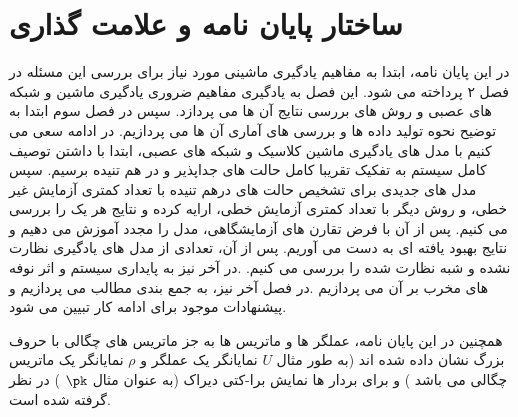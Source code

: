 \section{ساختار پایان نامه و علامت گذاری}





در این پایان نامه، ابتدا به مفاهیم یادگیری ماشینی مورد نیاز برای بررسی این مسئله در فصل ۲ پرداخته می شود. این فصل به یادگیری  مفاهیم ضروری یادگیری ماشین و شبکه های عصبی و روش های بررسی نتایج آن ها می پردازد.
سپس در فصل سوم ابتدا به توضیح نحوه تولید داده ها و بررسی های آماری آن ها می پردازیم. در ادامه سعی می کنیم با مدل های یادگیری ماشین کلاسیک و شبکه های عصبی، ابتدا با داشتن توصیف کامل سیستم به تفکیک تقریبا کامل حالت های جداپذیر و در هم تنیده برسیم. سپس مدل های جدیدی برای تشخیص حالت های درهم تنیده با تعداد کمتری آزمایش غیر خطی، و روش دیگر با تعداد کمتری آزمایش خطی، ارایه کرده و نتایج هر یک را بررسی می کنیم. پس از آن با فرض تقارن های آزمایشگاهی، مدل را مجدد آموزش می دهیم و نتایج بهبود یافته ای به دست می آوریم.
پس از آن، تعدادی از مدل های یادگیری نظارت نشده و شبه نظارت شده را بررسی می کنیم.
.در آخر نیز به پایداری سیستم و اثر نوفه های مخرب بر آن می پردازیم
.در فصل آخر نیز، به جمع بندی مطالب می پردازیم و پیشنهادات موجود برای ادامه کار تبیین می شود.

همچنین در این پایان نامه، عملگر ها و ماتریس ها به جز ماتریس های چگالی با حروف بزرگ نشان داده شده اند  (به طور مثال
$U$
نمایانگر یک عملگر و
$\rho$
نمایانگر یک ماتریس چگالی می باشد
) و
برای بردار ها نمایش برا-کتی دیراک (به عنوان مثال
$\pk$
) در نظر گرفته شده است.
